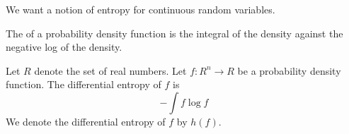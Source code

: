
\sbasic























\sstart
{}


We want a notion of entropy
for continuous random variables.


The 
of a probability density function
is the integral of the density
against the negative log
of the density.


Let $R$ denote the set of
real numbers.
Let $f: R^n \to R$ be
a probability density function.
The differential entropy of $f$
is
\[
  - \int f \log f
\]
We denote the differential entropy
of $f$ by $h(f)$.
\strats
